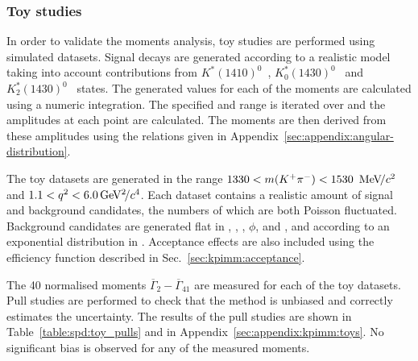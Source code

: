 \subsubsection{Toy studies}
\label{sec:kpimm:angular-analysis:toys}

In order to validate the moments analysis, toy studies are performed using simulated datasets. Signal decays are generated according to a realistic model taking into account contributions from $K^\ast(1410)^0$~\cite{Zwicky-K_1_1410}, $K^\ast_0(1430)^0$~\cite{Wang-K_0_1430} and $K^\ast_2(1430)^0$~\cite{Wang-K_2_1430} states. The generated values for each of the moments are calculated using a numeric integration. The specified \mkpi and \qsq range is iterated over and the amplitudes at each point are calculated. The moments are then derived from these amplitudes using the relations given in Appendix~\ref{sec:appendix:angular-distribution}.

The toy datasets are generated in the range $1330<m({{K}^+}{{\pi}^-})<1530~{\mathrm{\,Me\kern -0.1em V\!/}c^2}$ and $1.1<{q^2}<6.0{\mathrm{\,Ge\kern -0.1em V^2\!/}c^4}$. Each dataset contains a realistic amount of signal and background candidates, the numbers of which are both Poisson fluctuated. Background candidates are generated flat in \qsq, \ctl, \ctk, $\phi$, and \mkpi, and according to an exponential distribution in \mkpimm. Acceptance effects are also included using the efficiency function described in Sec.~\ref{sec:kpimm:acceptance}.
 
The 40 normalised moments $\overline{\Gamma}_{2}-\overline{\Gamma}_{41}$ are measured for each of the toy datasets. Pull studies are performed to check that the method is unbiased and correctly estimates the uncertainty. The results of the pull studies are shown in Table~\ref{table:spd:toy_pulls} and in Appendix~\ref{sec:appendix:kpimm:toys}. No significant bias is observed for any of the measured moments.


